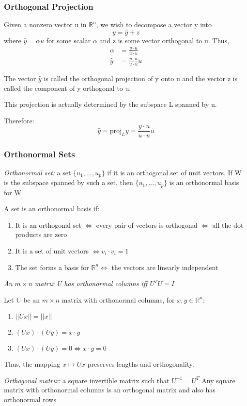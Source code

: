 \documentclass[12pt]{article} %
\newcommand{\R}{\mathbb{R}}
\begin{document}
\subsubsection{Orthogonal Projection}
Given a nonzero vector u in $\R^n$, we wish to decompose a vector y into $$y = \hat{y} + z$$ where $\hat{y} = \alpha u$ for some scalar $\alpha$ and z is some vector orthogonal to u. 
Thus, 
\begin{align*}
	\alpha &= \frac{y \cdot u}{u \cdot u}\\
	\hat{y} &= \frac{y \cdot u}{u \cdot u} u
\end{align*}

The vector $\hat{y}$ is called the orthogonal projection of y onto u and the vector z is called the component of y orthogonal to u.

This projection is actually determined by the subspace L spanned by u.

Therefore:
$$\hat{y} = \text{proj}_L y = \frac{y \cdot u}{u \cdot u} u$$

\subsubsection{Orthonormal Sets}
\emph{Orthonormal set:} a set $\{u_1, ..., u_p\}$ if it is an orthogonal set of unit vectors. If W is the subspace spanned by such a set, then $\{u_1, ..., u_p\}$ is an orthonormal basis for W

A set is an orthonormal basis if:
\begin{enumerate}
	\item It is an orthogonal set $\iff$ every pair of vectors is orthogonal $\iff$ all the dot products are zero
	\item It is a set of unit vectors $\iff v_i \cdot v_i = 1$
	\item The set forms a basis for $\R^n \iff$ the vectors are linearly independent 
\end{enumerate}

\emph{An $m \times n$ matrix U has orthonormal columns iff $U^T U = I$}

Let U be an $m \times n$ matrix with orthonormal columns, for $x, y \in \R^n$:
\begin{enumerate}
	\item $||U x|| = ||x||$
	\item $(Ux) \cdot (Uy) = x \cdot y$
	\item $(Ux) \cdot (Uy) = 0 \iff x \cdot y = 0$ 
\end{enumerate}

Thus, the mapping $x \mapsto Ux$ preserves lengths and orthogonality.

\emph{Orthogonal matrix:} a square invertible matrix such that $U^{-1} = U^T$
Any square matrix with orthonormal columns is an orthogonal matrix and also has orthonormal rows
\end{document}
